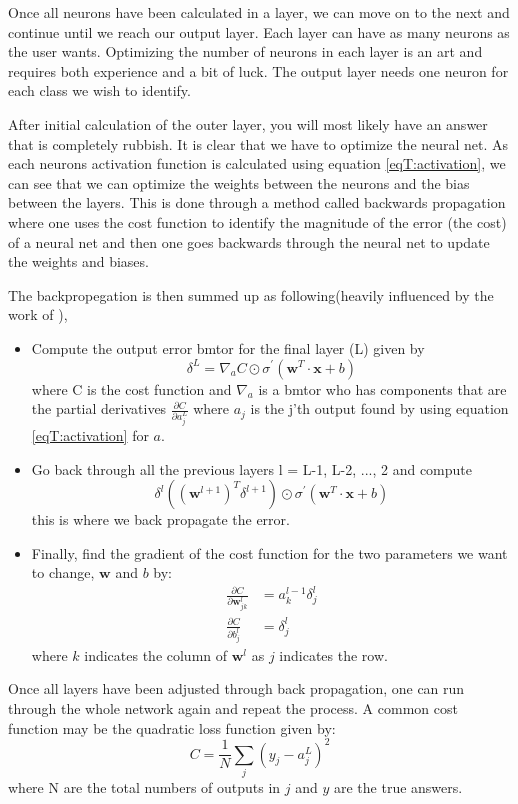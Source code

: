 Once all neurons have been calculated in a layer, we can move on to the next and continue until we reach our output layer. Each layer can have as many neurons as the user wants. Optimizing the number of neurons in each layer is an art and requires both experience and a bit of luck. The output layer needs one neuron for each class we wish to identify.

After initial calculation of the outer layer, you will most likely have an answer that is completely rubbish. It is clear that we have to optimize the neural net. As each neurons activation function is calculated using equation \eqref{eqT:activation}, we can see that we can optimize the weights between the neurons and the bias between the layers. This is done through a method called backwards propagation where one uses the cost function to identify the magnitude of the error (the cost) of a neural net and then one goes backwards through the neural net to update the weights and biases.

The backpropegation is then summed up as following(heavily influenced by the work of \citet{Nielsen}),
\begin{itemize}
    \item Compute the output error bmtor for the final layer (L) given by
    \begin{equation*}
        \delta^L = \nabla_a C \odot \sigma^{'}(\bm{w}^T \cdot \bm{x} + b)
    \end{equation*}
    where C is the cost function and $\nabla_a$ is a bmtor who has components that are the partial derivatives $\frac{\partial C}{\partial a_j^L}$ where $a_j$ is the j'th output found by using equation \eqref{eqT:activation} for $a$.
    \item Go back through all the previous layers l = L-1, L-2, ..., 2 and compute
    \begin{equation*}
        \delta^l ((\bm{w}^{l + 1})^T \delta^{l + 1}) \odot \sigma^{'}(\bm{w}^T \cdot \bm{x} + b)
    \end{equation*}
    this is where we back propagate the error.
    \item Finally, find the gradient of the cost function for the two parameters we want to change, $\bm{w}$ and $b$ by:
    \begin{align*}
        \frac{\partial C}{\partial \bm{w}_{jk}^l} &= a_k^{l-1}\delta_{j}^{l} \\
        \frac{\partial C}{\partial b_{j}^l} &= \delta_{j}^{l}
    \end{align*}
    where $k$ indicates the column of $\bm{w}^l$ as $j$ indicates the row.
\end{itemize}
Once all layers have been adjusted through back propagation, one can run through the whole network again and repeat the process. A common cost function may be the quadratic loss function given by:
\begin{equation}
    C = \frac{1}{N} \sum\limits_{j} (y_j - a_j^L)^2
\end{equation}
where N are the total numbers of outputs in $j$ and $y$ are the true answers.

